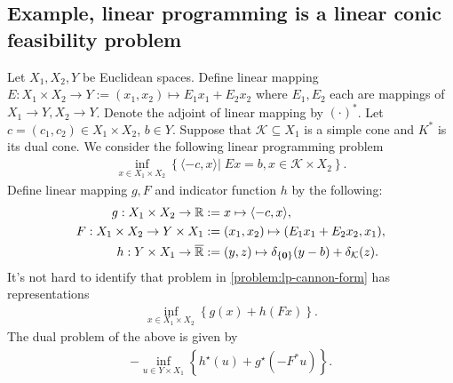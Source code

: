 \documentclass[12pt]{report}
\begin{document}
        \subsection{Example, linear programming is a linear conic feasibility problem}
            Let $X_1, X_2, Y$ be Euclidean spaces. 
            Define linear mapping $E:X_1 \times X_2 \rightarrow Y := (x_1, x_2)\mapsto E_1 x_1 + E_2 x_2$ where $E_1, E_2$ each are mappings of $X_1 \rightarrow Y, X_2 \rightarrow Y$. 
            Denote the adjoint of linear mapping by $(\cdot)^*$. 
            Let $c = (c_1, c_2) \in X_1 \times X_2$, $b \in Y$. 
            Suppose that $\mathcal K \subseteq X_1$ is a simple cone and $K^*$ is its dual cone. 
            We consider the following linear programming problem 
            \begin{align}\label{problem:lp-cannon-form}
                \inf_{x \in X_1\times X_2}\left\lbrace
                    \langle - c, x\rangle
                    \left| \;
                        Ex = b, x \in \mathcal K \times X_2
                    \right.
                \right\rbrace. 
            \end{align}
            Define linear mapping $g, F$ and indicator function $h$ by the following: 
            \begin{align*}
                g:X_1\times X_2 \rightarrow \mathbb R 
                    &:= x \mapsto \langle - c, x\rangle, 
                \\
                F: X_1\times X_2 \rightarrow Y \times X_1 
                    &:= (x_1, x_2) \mapsto (E_1x_1 + E_2 x_2, x_1),
                \\
                h: Y \times X_1 \rightarrow \overline {\mathbb R} &:= 
                    (y, z) \mapsto \delta_{\{\mathbf 0\}}(y - b) + \delta_{\mathcal K}(z). 
            \end{align*}
            It's not hard to identify that problem in \eqref{problem:lp-cannon-form} has representations 
            \begin{align*}
                \inf_{x \in X_1\times X_2}
                \left\lbrace
                    g(x) + h(Fx)
                \right\rbrace. 
            \end{align*}
            The dual problem of the above is given by
            \begin{align*}
                -\inf_{u \in Y\times X_1}
                \left\lbrace
                    h^\star(u) + g^\star(-F^* u)
                \right\rbrace. 
            \end{align*}
\end{document}
